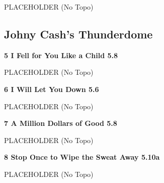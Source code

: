 \begin{multicols}{2}
			\begin{adjustwidth}{0.5cm}{}			
			PLACEHOLDER (No Topo)
			\end{adjustwidth}
			
			
		
		
		\needspace{1.5cm}
		\subsection*{Johny Cash's Thunderdome}\label{bf:Johny Cash's Thunderdome}
			
		
			
			\needspace{1.5cm}
\label{rt:I Fell for You Like a Child}
\colorbox{green!20}{
\parbox{0.95\linewidth}{
\textbf{
5 I Fell for You Like a Child 5.8  
}}}

			\begin{adjustwidth}{0.5cm}{}			
			PLACEHOLDER (No Topo)
			\end{adjustwidth}
			
			
			
			\needspace{1.5cm}
\label{rt:I Will Let You Down}
\colorbox{green!20}{
\parbox{0.95\linewidth}{
\textbf{
6 I Will Let You Down 5.6  
}}}

			\begin{adjustwidth}{0.5cm}{}			
			PLACEHOLDER (No Topo)
			\end{adjustwidth}
			
			
			
			\needspace{1.5cm}
\label{rt:A Million Dollars of Good}
\colorbox{green!20}{
\parbox{0.95\linewidth}{
\textbf{
7 A Million Dollars of Good 5.8  
}}}

			\begin{adjustwidth}{0.5cm}{}			
			PLACEHOLDER (No Topo)
			\end{adjustwidth}
			
			
			
			\needspace{1.5cm}
\label{rt:Stop Once to Wipe the Sweat Away}
\colorbox{RoyalBlue!20}{
\parbox{0.95\linewidth}{
\textbf{
8 Stop Once to Wipe the Sweat Away 5.10a  
}}}

			\begin{adjustwidth}{0.5cm}{}			
			PLACEHOLDER (No Topo)
			\end{adjustwidth}
			
			
		
	

\end{multicols}
\clearpage